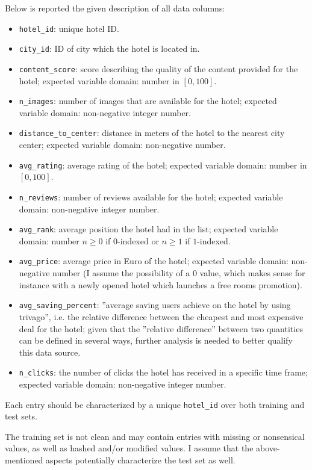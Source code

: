 \documentclass[preprint,12pt,3p]{elsarticle}
\begin{document}
Below is reported the given description of all data columns:
\begin{itemize}
	\item \verb|hotel_id|: unique hotel ID.
	\item \verb|city_id|: ID of city which the hotel is located in.
	\item \verb|content_score|: score describing the quality of the content provided for the hotel; expected variable domain: number in $[0,100]$.
	\item \verb|n_images|: number of images that are available for the hotel; expected variable domain: non-negative integer number.
	\item \verb|distance_to_center|: distance in meters of the hotel to the nearest city center; expected variable domain: non-negative number.
	\item \verb|avg_rating|: average rating of the hotel; expected variable domain: number in $[0,100]$.
	\item \verb|n_reviews|: number of reviews available for the hotel; expected variable domain: non-negative integer number.
	\item \verb|avg_rank|: average position the hotel had in the list; expected variable domain: number $n\ge0$ if $0$-indexed or $n\ge1$ if $1$-indexed.
	\item \verb|avg_price|: average price in Euro of the hotel; expected variable domain: non-negative number (I assume the possibility of a $0$ value, which makes sense for instance with a newly opened hotel which launches a free rooms promotion).
	\item \verb|avg_saving_percent|: ''average saving users achieve on the hotel by using trivago'', i.e. the relative difference between the cheapest and most expensive deal for the hotel; given that the ''relative difference'' between two quantities can be defined in several ways, further analysis is needed to better qualify this data source.
	\item \verb|n_clicks|: the number of clicks the hotel has received in a specific time frame; expected variable domain: non-negative integer number.
\end{itemize}

Each entry should be characterized by a unique \verb|hotel_id| over both training and test sets.

The training set is not clean and may contain entries with missing or nonsensical values, as well as hashed and/or modified values. I assume that the above-mentioned aspects potentially characterize the test set as well.
\end{document}
